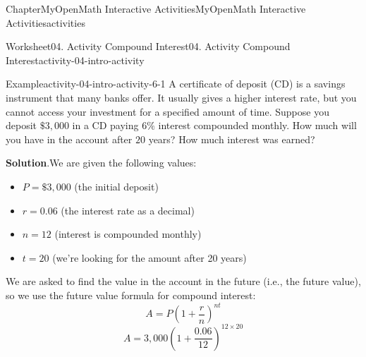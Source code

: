 \documentclass[oneside,10pt,]{book}
\newcommand{\blocktitlefont}{\relax}
\newcommand{\ptxlistdisc}{\raisebox{0.3ex}{\textbullet}}
\newlength{\fillinmaxwidth}
\newlength{\fillincontract}
\newlength{\charmaxwidth}\setlength{\charmaxwidth}{0.5em}
\newlength{\charminwidth}\setlength{\charminwidth}{0.1em}
\newlength{\fillinheight}
\newcommand{\fillintext}[1]{%
\setlength{\fillinmaxwidth}{#1\charmaxwidth}%
\setlength{\fillincontract}{#1\charminwidth}%
\setlength{\fillinheight}{\baselineskip}\addtolength{\fillinheight}{1.2pt}%
\strut\nobreak\leaders\vbox{\hrule width 0.3pt height 0.3pt \vskip -1.2pt}\hskip 1\fillinmaxwidth minus \fillincontract\nobreak\strut%
}
\begin{document}
\begin{chapterptx}{Chapter}{MyOpenMath Interactive Activities}{}{MyOpenMath Interactive Activities}{}{}{activities}
\begin{worksheet-section}{Worksheet}{04. Activity Compound Interest}{}{04. Activity Compound Interest}{}{}{activity-04-intro-activity}
%
\clearpage
\begin{example}{Example}{}{activity-04-intro-activity-6-1}%
A certificate of deposit (CD) is a savings instrument that many banks offer. It usually gives a higher interest rate, but you cannot access your investment for a specified amount of time. Suppose you deposit \(\$3,000\) in a CD paying \(6\%\) interest compounded monthly. How much will you have in the account after \(20\) years? How much interest was earned?%
\par\smallskip%
\noindent\textbf{\blocktitlefont Solution}.\hypertarget{activity-04-intro-activity-6-1-2}{}\quad{}We are given the following values:%
\begin{itemize}[label=\ptxlistdisc]
\item{}\(P = \$3,000\) (the initial deposit)%
\item{}\(r = 0.06\) (the interest rate as a decimal)%
\item{}\(n = 12\) (interest is compounded monthly)%
\item{}\(t = 20\) (we're looking for the amount after 20 years)%
\end{itemize}
%
\par
We are asked to find the value in the account in the future (i.e., the future value), so we use the future value formula for compound interest:%
\begin{equation*}
A = P\left(1 + \frac{r}{n}\right)^{nt}
\end{equation*}
%
\begin{equation*}
A = 3,000\left(1 + \frac{0.06}{12}\right)^{12 \times 20}

\end{equation*}
\end{example}
\end{worksheet-section}
\end{chapterptx}
\end{document}
